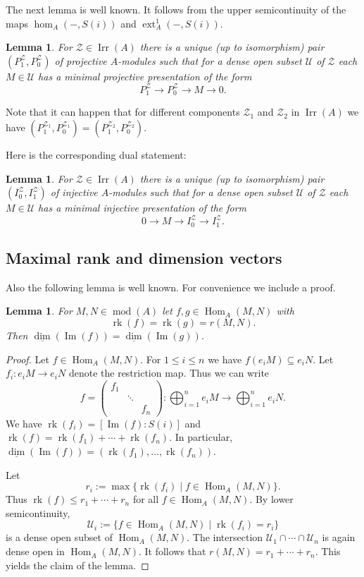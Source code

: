 \documentclass[12pt,reqno]{amsart}
\newtheorem{Lem}[Thm]{Lemma}
\theoremstyle{definition}
\newcommand{\df}{\colon}
\newcommand{\rk}{\operatorname{rk}}
\newcommand{\md}{\operatorname{mod}}
\newcommand{\dimv}{\underline{\dim}}
\newcommand{\Hom}{\operatorname{Hom}}
\newcommand{\ext}{\operatorname{ext}}
\newcommand{\Ima}{\operatorname{Im}}
\newcommand{\irr}{\operatorname{Irr}}
\newcommand{\bbm}{\begin{matrix}}
\newcommand{\ebm}{\end{matrix}}
\newcommand{\calU}{\mathcal{U}}
\newcommand{\calZ}{\mathcal{Z}}
\begin{document}
The next lemma is well known.
It
follows from the upper semicontinuity of
the maps $\hom_A(-,S(i))$ and $\ext_A^1(-,S(i))$.

\begin{Lem}\label{lem:genericpresentations1}
For $\calZ \in \irr(A)$ there is a unique (up to isomorphism) pair
$(P_1^{\calZ},P_0^{\calZ})$
of projective $A$-modules such that for a dense open subset
$\calU$ of $\calZ$ each $M \in \calU$ has a minimal projective presentation of the form
$$
P_1^{\calZ} \to P_0^{\calZ} \to M \to 0.
$$
\end{Lem}

Note that it can happen that for different components $\calZ_1$
and $\calZ_2$ in $\irr(A)$ we have
$(P_1^{\calZ_1},P_0^{\calZ_1}) = (P_1^{\calZ_2},P_0^{\calZ_2})$.


Here is the corresponding dual statement:

\begin{Lem}\label{lem:genericpresentations2}
For $\calZ \in \irr(A)$ there is a unique (up to isomorphism) pair
$(I_0^{\calZ},I_1^{\calZ})$
of injective $A$-modules such that for a dense open subset
$\calU$ of $\calZ$ each $M \in \calU$ has a minimal injective presentation of the form
$$
0 \to M \to I_0^{\calZ} \to I_1^{\calZ}.
$$
\end{Lem}

\subsection{Maximal rank and dimension vectors}
Also the following lemma is well known.
For convenience we include a proof.

\begin{Lem}\label{lem:maximalrank}
For $M,N \in \md(A)$ let $f,g \in \Hom_A(M,N)$ with
$$
\rk(f) = \rk(g) = r(M,N).
$$
Then $\dimv(\Ima(f)) = \dimv(\Ima(g))$.
\end{Lem}


\begin{proof}
Let $f \in \Hom_A(M,N)$.
For $1 \le i \le n$ we have $f(e_iM) \subseteq e_iN$.
Let $f_i\df e_iM \to e_iN$ denote the restriction map.
Thus we can write
$$
f = \left(\bbm f_1 &&\\&\ddots&\\&&f_n\ebm\right)\df \bigoplus_{i=1}^n e_iM
\to \bigoplus_{i=1}^n e_iN.
$$
We have $\rk(f_i) = [\Ima(f):S(i)]$ and
$\rk(f) = \rk(f_1) + \cdots +\rk(f_n)$.
In particular, $\dimv(\Ima(f)) = (\rk(f_1),\ldots,\rk(f_n))$.

Let
$$
r_i := \max\{ \rk(f_i) \mid f \in \Hom_A(M,N) \}.
$$
Thus
$\rk(f) \le r_1 + \cdots + r_n$ for all $f \in \Hom_A(M,N)$.
By lower semicontinuity,
$$
\calU_i := \{ f \in \Hom_A(M,N) \mid \rk(f_i) = r_i \}
$$
is a dense open subset of $\Hom_A(M,N)$.
The intersection $\calU_1 \cap \cdots \cap \calU_n$ is
again dense open in $\Hom_A(M,N)$.
It follows that $r(M,N) = r_1 + \cdots + r_n$.
This yields the claim of the lemma.
\end{proof}
\end{document}
